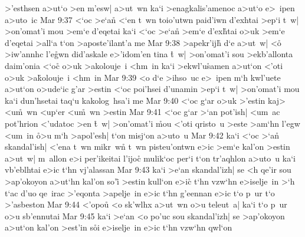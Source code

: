 >'esthsen
a>ut`o
>en
m'esw|
a>ut~wn
ka`i
>enagkalis'amenoc
a>ut`o
e>~ipen
a>uto~ic\bibvsend
\vs Mar 9:37
<`oc
>e`a\r{n}
<`en
t~wn
toio'utwn
paid'iwn
d'exhtai
>ep`i
t~w|
>on'omat'i
mou
>em`e
d'eqetai
ka`i
<`oc
>e`a\r{n}
>em`e
d'ex\r{h}tai
o>uk
>em`e
d'eqetai
>all`a
t`on
>aposte'ilant'a
me\bibvsend
\vs Mar 9:38
>apekr'ijh\r{}
d`e
a>ut~w|
<o\r{}
>iw'annhc
l'e\r{g}wn
did'askale
e>'idom'en
tina
\r{t}~w|
>on'omat'i
sou
>ekb'allonta
daim'onia
<`oc\r{}
o>uk
>akolouje~i
<hm~in
ka`i
>ekwl'u\r{s}amen
a>ut`on
<'oti
o>uk
>a\r{k}olouje~i
<hm~in\bibvsend
\vs Mar 9:39
<o
d`e
>ihso~uc
e>~ipen
m`h
kwl'uete
a>ut`on
o>ude`ic
g'ar
>estin
<`oc
poi'hsei
d'unamin
>ep`i
t~w|
>on'omat'i
mou
ka`i
dun'hsetai
taq`u
kakolog~hsa'i
me\bibvsend
\vs Mar 9:40
<`oc
g`ar
o>uk
>'estin
kaj>
<u\r{m}~wn
<up`er
<u\r{m}~wn
>estin\bibvsend
\vs Mar 9:41
<`oc
g`ar
>`an
pot'ish|
<um~ac
pot'hrion
<'udatoc
>en
\r{t}~w|
>on'omat'i
\r{m}ou
<'oti
qristo~u
>este
>am`hn
l'egw
<um~in
\r{o}>u
m`h
>apol'esh|
t`on
misj`on
a>uto~u\bibvsend
\vs Mar 9:42
ka`i
<`oc
>`a\r{n}
skandal'ish|
<'ena
t~wn
mikr~w\r{n}
t~wn
pisteu'ontwn
e>ic
>em`e
kal'on
>estin
a>ut~w|
m~allon
e>i
per'ikeitai
l'ijoc\r{}
mulik`oc
per`i
t`on
tr'aqhlon
a>uto~u
ka`i
vb'eblhtai
e>ic
t`hn
vj'alassan\bibvsend
\vs Mar 9:43
ka`i
>e`an
skandal'izh|
se
<h
qe'ir
sou
>ap'okoyon
a>ut`hn
kal'on
so'i\r{}
>estin
kull`on
e>ic\r{}
t`hn
vzw`hn
e>iselje~in
>`h
t`ac
d'uo
qe~irac
>'eqonta
>apelje~in
e>ic
t`hn
g'eennan
e>ic
t`o
p~ur
t`o
>'asbeston\bibvsend
\vs Mar 9:44
<'opou\r{}
<o
sk'wlhx
a>ut~wn
o>u
teleut~a|
ka`i
t`o
p~ur
o>u
sb'ennutai\bibvsend
\vs Mar 9:45
ka`i
>e`an
<o
po'uc
sou
skandal'izh|
se
>ap'okoyon
a>ut`on
kal'on
>est'in
s\r{o}i
e>iselje~in
e>ic
t`hn
vzw`hn
qwl`on
